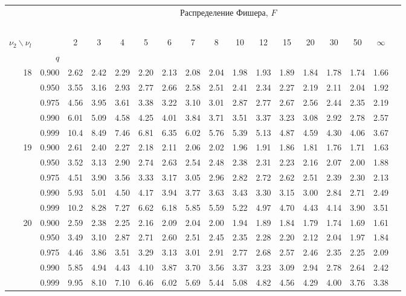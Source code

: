 {\begin{center}
\begin{tabular}{rrr@{\,}r@{\,}r@{\,}r@{\,}r@{\,}r@{\,}r@{\,}r
                   @{\,}r@{\,}r@{\,}r@{\,}r@{\,}r@{\,}r@{\,}r}
&&\multicolumn{14}{c}{Распределение Фишера, $F$}\\
\ \\
$\nu_2\backslash\nu_l$ & & 
\multicolumn{1}{c}{2} &\multicolumn{1}{c}{3} &
\multicolumn{1}{c}{4} &\multicolumn{1}{c}{5} &
\multicolumn{1}{c}{6} &\multicolumn{1}{c}{7} &
\multicolumn{1}{c}{8} &\multicolumn{1}{c}{10}&
\multicolumn{1}{c}{12}&\multicolumn{1}{c}{15}&
\multicolumn{1}{c}{20}&\multicolumn{1}{c}{30}&
\multicolumn{1}{c}{50}&\multicolumn{1}{c}{$\infty$}\\
& $q$ \\
18&0.900&2.62&2.42&2.29&2.20&2.13&2.08&2.04&1.98&1.93&1.89&1.84&1.78&1.74&1.66\\
  &0.950&3.55&3.16&2.93&2.77&2.66&2.58&2.51&2.41&2.34&2.27&2.19&2.11&2.04&1.92\\
  &0.975&4.56&3.95&3.61&3.38&3.22&3.10&3.01&2.87&2.77&2.67&2.56&2.44&2.35&2.19\\
  &0.990&6.01&5.09&4.58&4.25&4.01&3.84&3.71&3.51&3.37&3.23&3.08&2.92&2.78&2.57\\
  &0.999&10.4&8.49&7.46&6.81&6.35&6.02&5.76&5.39&5.13&4.87&4.59&4.30&4.06&3.67\\
19&0.900&2.61&2.40&2.27&2.18&2.11&2.06&2.02&1.96&1.91&1.86&1.81&1.76&1.71&1.63\\
  &0.950&3.52&3.13&2.90&2.74&2.63&2.54&2.48&2.38&2.31&2.23&2.16&2.07&2.00&1.88\\
  &0.975&4.51&3.90&3.56&3.33&3.17&3.05&2.96&2.82&2.72&2.62&2.51&2.39&2.30&2.13\\
  &0.990&5.93&5.01&4.50&4.17&3.94&3.77&3.63&3.43&3.30&3.15&3.00&2.84&2.71&2.49\\
  &0.999&10.2&8.28&7.27&6.62&6.18&5.85&5.59&5.22&4.97&4.70&4.43&4.14&3.90&3.51\\
20&0.900&2.59&2.38&2.25&2.16&2.09&2.04&2.00&1.94&1.89&1.84&1.79&1.74&1.69&1.61\\
  &0.950&3.49&3.10&2.87&2.71&2.60&2.51&2.45&2.35&2.28&2.20&2.12&2.04&1.97&1.84\\
  &0.975&4.46&3.86&3.51&3.29&3.13&3.01&2.91&2.77&2.68&2.57&2.46&2.35&2.25&2.09\\
  &0.990&5.85&4.94&4.43&4.10&3.87&3.70&3.56&3.37&3.23&3.09&2.94&2.78&2.64&2.42\\
  &0.999&9.95&8.10&7.10&6.46&6.02&5.69&5.44&5.08&4.82&4.56&4.29&4.00&3.76&3.38\\

\end{tabular}
\end{center}}
